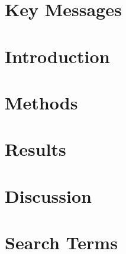 \documentclass{article}
\begin{document}
\maketitle
\tableofcontents
\clearpage
\section*{Key Messages}
\clearpage
\section{Introduction}\label{s:intro}     
\section{Methods}     \label{s:methods}   
\section{Results}     \label{s:results}   
\clearpage
\section{Discussion}  \label{s:discussion}
\clearpage
\appendix
\section{Search Terms}\label{a:search}    
\end{document}
